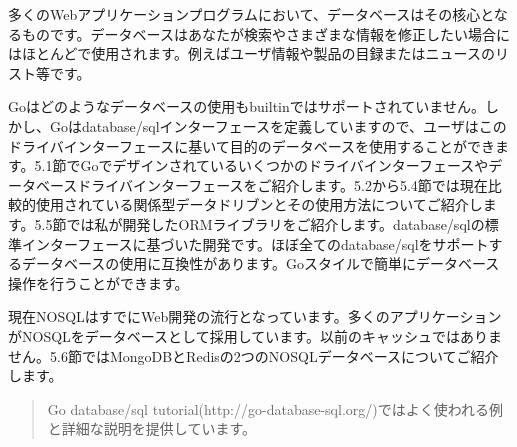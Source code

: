 多くのWebアプリケーションプログラムにおいて、データベースはその核心となるものです。データベースはあなたが検索やさまざまな情報を修正したい場合にはほとんどで使用されます。例えばユーザ情報や製品の目録またはニュースのリスト等です。

Goはどのようなデータベースの使用もbuiltinではサポートされていません。しかし、Goはdatabase/sqlインターフェースを定義していますので、ユーザはこのドライバインターフェースに基いて目的のデータベースを使用することができます。5.1節でGoでデザインされているいくつかのドライバインターフェースやデータベースドライバインターフェースをご紹介します。5.2から5.4節では現在比較的使用されている関係型データドリブンとその使用方法についてご紹介します。5.5節では私が開発したORMライブラリをご紹介します。database/sqlの標準インターフェースに基づいた開発です。ほぼ全てのdatabase/sqlをサポートするデータベースの使用に互換性があります。Goスタイルで簡単にデータベース操作を行うことができます。

現在NOSQLはすでにWeb開発の流行となっています。多くのアプリケーションがNOSQLをデータベースとして採用しています。以前のキャッシュではありません。5.6節ではMongoDBとRedisの2つのNOSQLデータベースについてご紹介します。

\begin{quote}
Go database/sql tutorial(http://go-database-sql.org/)ではよく使われる例と詳細な説明を提供しています。
\end{quote}
